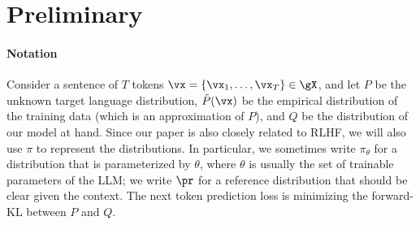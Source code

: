 \section{Preliminary}

\paragraph{Notation} Consider a sentence of $T$ tokens $\vx=\{\vx_1,\ldots, \vx_T\}\in\gX$, and let $P$ be the unknown target language distribution, $\tilde P(\vx)$ be the empirical distribution of the training data (which is an approximation of $P$), and $Q$ be the distribution of our model at hand. Since our paper is also closely related to RLHF, we will also use $\pi$ to represent the distributions. In particular, we sometimes write $\pi_\theta$ for a distribution that is parameterized by $\theta$, where $\theta$ is usually the set of trainable parameters of the LLM; we write $\pr$ for a reference distribution that should be clear given the context. The next token prediction loss is minimizing the forward-KL between $P$ and $Q$. 



